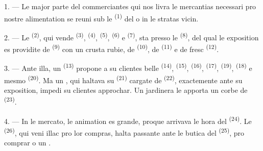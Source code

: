 
\VUsaut{4.0mm}
\VUsaut{3.0mm}

\VUsaut{3.0mm}

1. --- Le major parte del commerciantes qui nos livra le mercantias necessari pro
nostre alimentation se reuni sub le  \textsuperscript{(1)} del
 o in le stratas vicin.

2. --- Le  \textsuperscript{(2)}, qui vende 
\textsuperscript{(3)},  \textsuperscript{(4)},
 \textsuperscript{(5)}, 
\textsuperscript{(6)} e  \textsuperscript{(7)}, sta presso le
 \textsuperscript{(8)}, del qual le
exposition es providite de  \textsuperscript{(9)} con
un crusta rubie, de  \textsuperscript{(10)}, de
 \textsuperscript{(11)} e de fresc  \textsuperscript{(12)}.

3. --- Ante illa, un  \textsuperscript{(13)}
propone a su clientes belle  \textsuperscript{(14)},
 \textsuperscript{(15)},  \textsuperscript{(16)},  \textsuperscript{(17)},
 \textsuperscript{(19)}, 
\textsuperscript{(18)} e mesmo  \textsuperscript{(20)}. Ma un
, qui haltava su 
\textsuperscript{(21)} cargate de 
\textsuperscript{(22)}, exactemente ante su exposition, impedi su clientes
approchar. Un jardinera le apporta un corbe de 
\textsuperscript{(23)}.

\VUsaut{4.0mm}
\VUsaut{3.0mm}

4. --- In le mercato, le animation es grande, proque arrivava le hora del
 \textsuperscript{(24)}. Le  \textsuperscript{(26)}, qui veni illac pro lor compras, halta passante
ante le butica del  \textsuperscript{(25)}, pro
comprar  o un .

